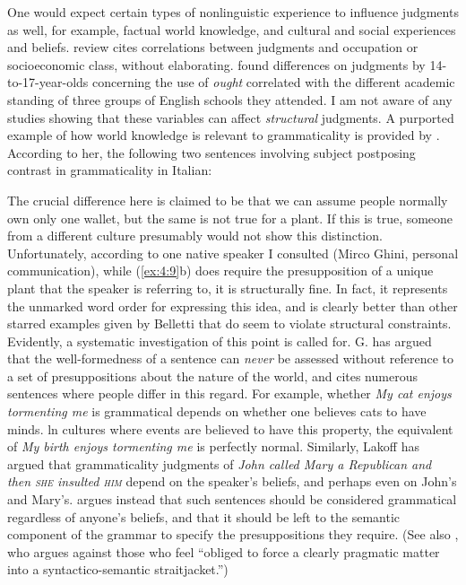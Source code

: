 One would expect certain types of nonlinguistic experience to influence judgments as well, for example, factual world knowledge, and cultural and social
experiences and beliefs.  review
cites correlations between judgments and occupation or socioeconomic class, without elaborating. \citet{SvartvikEtAl1977} found differences on judgments by 14-to-17-year-olds concerning the use of \textit{ought} correlated with the different academic standing of three groups of English schools they attended. I am not aware of any studies showing that these variables can affect \textit{structural} judgments. A purported example of how world knowledge is relevant to grammaticality is provided by \citet{Belletti1988}. According to her, the following two sentences involving subject postposing contrast in grammaticality in Italian:

\ea%
    \label{ex:4:9}
    \z
\z


\noindent
The crucial difference here is claimed to be that we can assume people normally own only one wallet, but the same is not true for a plant. If this is true, someone from a different culture presumably would not show this distinction. Unfortunately, according to one native speaker I consulted (Mirco Ghini, personal communication), while (\ref{ex:4:9}b) does require the presupposition of a unique plant that the speaker is referring to, it is structurally fine. In fact, it represents the unmarked word order for expressing this idea, and is clearly better than other starred examples given by Belletti that do seem to violate structural constraints. Evidently, a systematic investigation of this point is called for. G. \citet{Lakoff1971}
has argued that the well-formedness of a sentence can \textit{never} be assessed without reference to a set of presuppositions about the nature of the world, and cites numerous sentences where people differ in this regard. For example, whether \textit{My cat enjoys tormenting me} is grammatical depends on whether one believes cats to have minds. ln cultures where events are believed to have this property, the equivalent of \textit{My birth enjoys tormenting me} is perfectly normal. Similarly, Lakoff has argued that grammaticality judgments of \textit{John called Mary a Republican and then \textsc{she} insulted \textsc{him}} 
depend on the speaker's beliefs, and perhaps even on John's and Mary's. \citet{Chomsky1972} argues instead that such sentences should be considered grammatical regardless of anyone's beliefs, and that it should be left to the semantic component of the grammar to specify the presuppositions they require. (See also \citet{BarHillel1971}, who argues against those who feel ``obliged to force a clearly pragmatic matter into a syntactico-semantic straitjacket.'')

